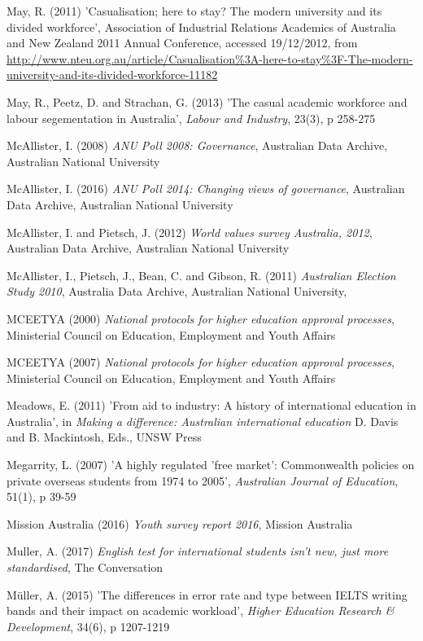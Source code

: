 \documentclass[]{book}
\begin{document}
May, R. (2011) 'Casualisation; here to stay? The modern university and its divided workforce', Association of Industrial Relations Academics of Australia and New Zealand 2011 Annual Conference, accessed 19/12/2012, from \url{http://www.nteu.org.au/article/Casualisation\%3A-here-to-stay\%3F-The-modern-university-and-its-divided-workforce-11182}

\protect\hypertarget{_ENREF_141}{}{}May, R., Peetz, D. and Strachan, G. (2013) 'The casual academic workforce and labour segementation in Australia', \emph{Labour and Industry}, 23(3), p 258-275

\protect\hypertarget{_ENREF_142}{}{}McAllister, I. (2008) \emph{ANU Poll 2008: Governance}, Australian Data Archive, Australian National University

\protect\hypertarget{_ENREF_143}{}{}McAllister, I. (2016) \emph{ANU Poll 2014: Changing views of governance}, Australian Data Archive, Australian National University

\protect\hypertarget{_ENREF_144}{}{}McAllister, I. and Pietsch, J. (2012) \emph{World values survey Australia, 2012}, Australian Data Archive, Australian National University

\protect\hypertarget{_ENREF_145}{}{}McAllister, I., Pietsch, J., Bean, C. and Gibson, R. (2011) \emph{Australian Election Study 2010}, Australia Data Archive, Australian National University,

MCEETYA (2000) \emph{National protocols for higher education approval processes}, Ministerial Council on Education, Employment and Youth Affairs

MCEETYA (2007) \emph{National protocols for higher education approval processes}, Ministerial Council on Education, Employment and Youth Affairs

Meadows, E. (2011) 'From aid to industry: A history of international education in Australia', in \emph{Making a difference: Australian international education} D. Davis and B. Mackintosh, Eds., UNSW Press

Megarrity, L. (2007) 'A highly regulated 'free market': Commonwealth policies on private overseas students from 1974 to 2005', \emph{Australian Journal of Education}, 51(1), p 39-59

Mission Australia (2016) \emph{Youth survey report 2016}, Mission Australia

Muller, A. (2017) \emph{English test for international students isn't new, just more standardised}, The Conversation

Müller, A. (2015) 'The differences in error rate and type between IELTS writing bands and their impact on academic workload', \emph{Higher Education Research \& Development}, 34(6), p 1207-1219
\end{document}
